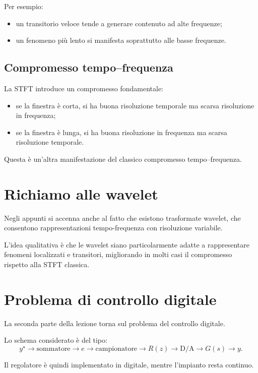 Per esempio:
\begin{itemize}
    \item un transitorio veloce tende a generare contenuto ad alte frequenze;
    \item un fenomeno più lento si manifesta soprattutto alle basse frequenze.
\end{itemize}

\subsection{Compromesso tempo--frequenza}

La STFT introduce un compromesso fondamentale:
\begin{itemize}
    \item se la finestra è corta, si ha buona risoluzione temporale ma scarsa risoluzione in frequenza;
    \item se la finestra è lunga, si ha buona risoluzione in frequenza ma scarsa risoluzione temporale.
\end{itemize}

Questa è un'altra manifestazione del classico compromesso tempo--frequenza.

\section{Richiamo alle wavelet}

Negli appunti si accenna anche al fatto che esistono trasformate wavelet,
che consentono rappresentazioni tempo-frequenza con risoluzione variabile.

L'idea qualitativa è che le wavelet siano particolarmente adatte
a rappresentare fenomeni localizzati e transitori,
migliorando in molti casi il compromesso rispetto alla STFT classica.

\section{Problema di controllo digitale}

La seconda parte della lezione torna sul problema del controllo digitale.

Lo schema considerato è del tipo:
\[
y^\star \longrightarrow \text{sommatore} \longrightarrow e
\longrightarrow \text{campionatore}
\longrightarrow R(z)
\longrightarrow \text{D/A}
\longrightarrow G(s)
\longrightarrow y.
\]

Il regolatore è quindi implementato in digitale, mentre l'impianto resta continuo.

